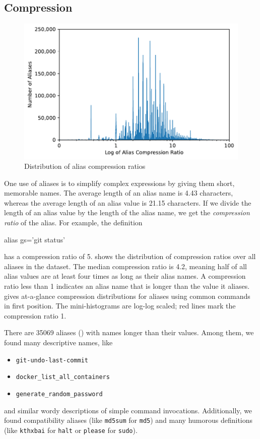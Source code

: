 \subsection{Compression}

\begin{figure}
    \centering
    \includegraphics[width=\columnwidth]{compression_dist.pdf}
    \caption{Distribution of alias compression ratios}
    \label{fig:compression}
\end{figure}

One use of aliases is to simplify complex expressions by giving them short, memorable names.
The average length of an alias name is \num{4.43} characters, whereas the average length of an alias value is \num{21.15} characters.
If we divide the length of an alias value by the length of the alias name, we get the \emph{compression ratio} of the alias.
For example, the definition
\begin{CVerbatim}
alias gs='git status'
\end{CVerbatim}
has a compression ratio of 5.
 shows the distribution of compression ratios over all aliases in the dataset.
The median compression ratio is 4.2, meaning half of all alias values are at least four times as long as their alias names.
A compression ratio less than 1 indicates an alias name that is longer than the value it aliases.
 gives at-a-glance compression distributions for aliases using common commands in first position.
The mini-histograms are log-log scaled; red lines mark the compression ratio 1.

There are \num{35069} aliases () with names longer than their values.
Among them, we found many descriptive names, like
\begin{itemize}
    \item \verb|git-undo-last-commit|
    \item \verb|docker_list_all_containers|
    \item \verb|generate_random_password|
\end{itemize}
and similar wordy descriptions of simple command invocations.
Additionally, we found compatibility aliases (like \texttt{md5sum} for \texttt{md5}) and many humorous definitions (like \texttt{kthxbai} for \texttt{halt} or \texttt{please} for \texttt{sudo}).

